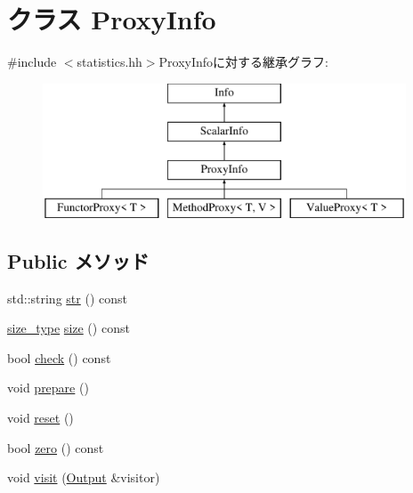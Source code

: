 \hypertarget{classStats_1_1ProxyInfo}{
\section{クラス ProxyInfo}
\label{classStats_1_1ProxyInfo}
}


{\ttfamily \#include $<$statistics.hh$>$}ProxyInfoに対する継承グラフ:\begin{figure}[H]
\begin{center}
\leavevmode
\includegraphics[height=4cm]{classStats_1_1ProxyInfo}
\end{center}
\end{figure}
\subsection*{Public メソッド}
\begin{DoxyCompactItemize}
\item 
std::string \hyperlink{classStats_1_1ProxyInfo_a1b9b8885b0880fc4ddf9a2c7d1ca3dc4}{str} () const 
\item 
\hyperlink{namespaceStats_ada51e68d31936547d3729c82daf6b7c6}{size\_\-type} \hyperlink{classStats_1_1ProxyInfo_a503ab01f6c0142145d3434f6924714e7}{size} () const 
\item 
bool \hyperlink{classStats_1_1ProxyInfo_a6ecddb2c44556b7acbc1723a968ff8bb}{check} () const 
\item 
void \hyperlink{classStats_1_1ProxyInfo_a1825b40ca3bc3a1ba67fdb58fac5015c}{prepare} ()
\item 
void \hyperlink{classStats_1_1ProxyInfo_ad20897c5c8bd47f5d4005989bead0e55}{reset} ()
\item 
bool \hyperlink{classStats_1_1ProxyInfo_a4e72b01b727d3165e75cba84eb507491}{zero} () const 
\item 
void \hyperlink{classStats_1_1ProxyInfo_adb3e1761782ea843b4400aeeaa6c4887}{visit} (\hyperlink{structStats_1_1Output}{Output} \&visitor)
\end{DoxyCompactItemize}


